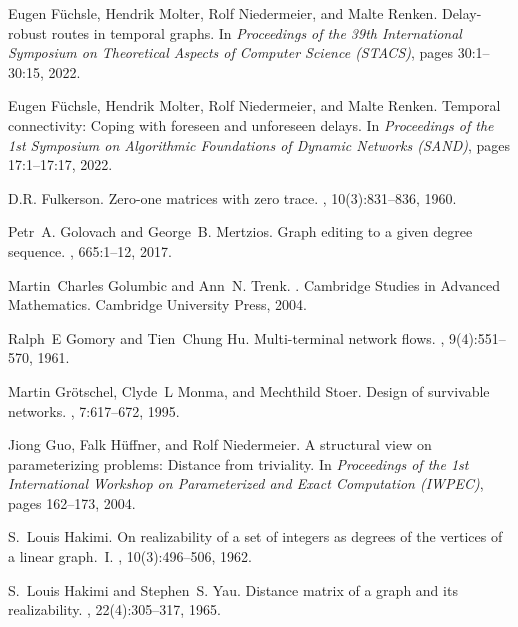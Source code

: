 \documentclass[a4paper,UKenglish,cleveref, autoref, thm-restate]{lipics-v2021}
\begin{document}
\begin{thebibliography}{10}
	Eugen F\"uchsle, Hendrik Molter, Rolf Niedermeier, and Malte Renken.
	\newblock Delay-robust routes in temporal graphs.
	\newblock In {\em Proceedings of the 39th International Symposium on
		Theoretical Aspects of Computer Science (STACS)}, pages 30:1--30:15, 2022.
	
	Eugen F{\"{u}}chsle, Hendrik Molter, Rolf Niedermeier, and Malte Renken.
	\newblock Temporal connectivity: Coping with foreseen and unforeseen delays.
	\newblock In {\em Proceedings of the 1st Symposium on Algorithmic Foundations
		of Dynamic Networks ({SAND})}, pages 17:1--17:17, 2022.
	
	D.R. Fulkerson.
	\newblock Zero-one matrices with zero trace.
	, 10(3):831--836, 1960.
	
	Petr~A. Golovach and George~B. Mertzios.
	\newblock Graph editing to a given degree sequence.
	, 665:1--12, 2017.
	
	Martin~Charles Golumbic and Ann~N. Trenk.
	.
	\newblock Cambridge Studies in Advanced Mathematics. Cambridge University
	Press, 2004.
	
	Ralph~E Gomory and Tien~Chung Hu.
	\newblock Multi-terminal network flows.
	,
	9(4):551--570, 1961.
	
	Martin Gr{\"o}tschel, Clyde~L Monma, and Mechthild Stoer.
	\newblock Design of survivable networks.
	,
	7:617--672, 1995.
	
	Jiong Guo, Falk H{\"u}ffner, and Rolf Niedermeier.
	\newblock A structural view on parameterizing problems: Distance from
	triviality.
	\newblock In {\em Proceedings of the 1st International Workshop on
		Parameterized and Exact Computation (IWPEC)}, pages 162--173, 2004.
	
	S.~Louis Hakimi.
	\newblock On realizability of a set of integers as degrees of the vertices of a
	linear graph.~{I}.
	,
	10(3):496--506, 1962.
	
	S.~Louis Hakimi and Stephen~S. Yau.
	\newblock Distance matrix of a graph and its realizability.
	, 22(4):305--317, 1965.
	

\end{thebibliography}
\end{document}
